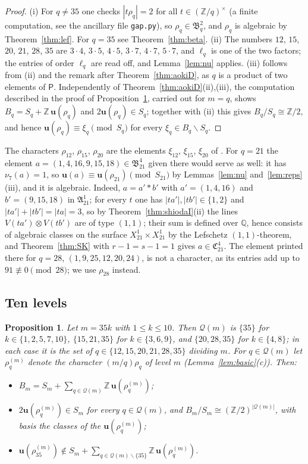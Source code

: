 \documentclass[11pt]{amsart}
\newtheorem{proposition}[theorem]{Proposition}
\theoremstyle{definition}
\theoremstyle{remark}
\numberwithin{equation}{section}
\newcommand{\Q}{\mathbb{Q}}
\newcommand{\Z}{\mathbb{Z}}
\newcommand{\fA}{\mathfrak{A}}
\newcommand{\fB}{\mathfrak{B}}
\newcommand{\fC}{\mathfrak{C}}
\newcommand{\cQ}{\mathcal{Q}}
\newcommand{\sP}{\mathsf{P}}
\newcommand{\uu}{\mathbf{u}}
\newcommand{\sm}{\smallsetminus}
\begin{document}
\begin{proof}
(i) For $q\ne35$ one checks $|t\rho_q|=2$ for all $t\in(\Z/q)^\times$ (a finite computation, see the ancillary file \texttt{gap.py}), so $\rho_q\in\fB^2_q$, and $\rho_q$ is algebraic by Theorem~\ref{thm:lef}. For $q=35$ see Theorem~\ref{thm:beta}. (ii) The numbers $12$, $15$, $20$, $21$, $28$, $35$ are $3\cdot4$, $3\cdot5$, $4\cdot5$, $3\cdot7$, $4\cdot7$, $5\cdot7$, and $\ell_q$ is one of the two factors; the entries of order $\ell_q$ are read off, and Lemma~\ref{lem:nu} applies. (iii) follows from (ii) and the remark after Theorem~\ref{thm:aokiD}, as $q$ is a product of two elements of $\sP$. Independently of Theorem~\ref{thm:aokiD}(ii),(iii), the computation described in the proof of Proposition~\ref{prop:tenlevels}, carried out for $m=q$, shows $B_q=S_q+\Z\,\uu(\rho_q)$ and $2\uu(\rho_q)\in S_q$; together with (ii) this gives $B_q/S_q\cong\Z/2$, and hence $\uu(\rho_q)\equiv\xi_q\pmod{S_q}$ for every $\xi_q\in B_q\sm S_q$.
\end{proof}

The characters $\rho_{12}$, $\rho_{15}$, $\rho_{20}$ are the elements $\xi_{12}$, $\xi_{15}$, $\xi_{20}$ of \cite[p.~185]{Ao00}. For $q=21$ the element $a=(1,4,16,9,15,18)\in\fB^4_{21}$ given there would serve as well: it has $\nu_7(a)=1$, so $\uu(a)\equiv\uu(\rho_{21})\pmod{S_{21}}$ by Lemmas~\ref{lem:nu} and~\ref{lem:reps}(iii), and it is algebraic. Indeed, $a=a'*b'$ with $a'=(1,4,16)$ and $b'=(9,15,18)$ in $\fA^1_{21}$; for every $t$ one has $|ta'|,|tb'|\in\{1,2\}$ and $|ta'|+|tb'|=|ta|=3$, so by Theorem~\ref{thm:shiodaI}(ii) the lines $V(ta')\otimes V(tb')$ are of type $(1,1)$; their sum is defined over $\Q$, hence consists of algebraic classes on the surface $X^1_{21}\times X^1_{21}$ by the Lefschetz $(1,1)$-theorem, and Theorem~\ref{thm:SK} with $r-1=s-1=1$ gives $a\in\fC^4_{21}$. The element printed there for $q=28$, $(1,9,25,12,20,24)$, is not a character, as its entries add up to $91\not\equiv0\pmod{28}$; we use $\rho_{28}$ instead.

\subsection{Ten levels}\label{subsec:ten}

\begin{proposition}\label{prop:tenlevels}
Let $m=35k$ with $1\le k\le 10$. Then $\cQ(m)$ is $\{35\}$ for $k\in\{1,2,5,7,10\}$, $\{15,21,35\}$ for $k\in\{3,6,9\}$, and $\{20,28,35\}$ for $k\in\{4,8\}$; in each case it is the set of $q\in\{12,15,20,21,28,35\}$ dividing $m$. For $q\in\cQ(m)$ let $\rho^{(m)}_q$ denote the character $(m/q)\rho_q$ of level $m$ (Lemma~\ref{lem:basic}(c)). Then:
\begin{itemize}
\item[(a)] $B_m=S_m+\sum_{q\in\cQ(m)}\Z\,\uu(\rho^{(m)}_q)$;
\item[(b)] $2\uu(\rho^{(m)}_q)\in S_m$ for every $q\in\cQ(m)$, and $B_m/S_m\cong(\Z/2)^{|\cQ(m)|}$, with basis the classes of the $\uu(\rho^{(m)}_q)$;
\item[(c)] $\uu(\rho^{(m)}_{35})\notin S_m+\sum_{q\in\cQ(m)\sm\{35\}}\Z\,\uu(\rho^{(m)}_q)$.
\end{itemize}
\end{proposition}
\end{document}
